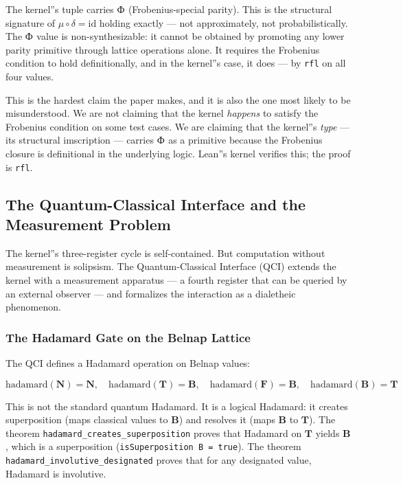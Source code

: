 \documentclass[12pt,a4paper]{article}
\begin{document}
The kernel''s tuple carries $\text{Ф}_{\text{}}$ (Frobenius-special parity). This is the structural signature of $\mu \circ \delta = \text{id}$ holding exactly --- not approximately, not probabilistically. The $\text{Ф}_{\text{}}$ value is non-synthesizable: it cannot be obtained by promoting any lower parity primitive through lattice operations alone. It requires the Frobenius condition to hold definitionally, and in the kernel''s case, it does --- by \texttt{rfl} on all four values.

This is the hardest claim the paper makes, and it is also the one most likely to be misunderstood. We are not claiming that the kernel \emph{happens} to satisfy the Frobenius condition on some test cases. We are claiming that the kernel''s \emph{type} --- its structural imscription --- carries $\text{Ф}_{\text{}}$ as a primitive because the Frobenius closure is definitional in the underlying logic. Lean''s kernel verifies this; the proof is \texttt{rfl}.

\subsection{The Quantum-Classical Interface and the Measurement Problem}

The kernel''s three-register cycle is self-contained. But computation without measurement is solipsism. The Quantum-Classical Interface (QCI) extends the kernel with a measurement apparatus --- a fourth register that can be queried by an external observer --- and formalizes the interaction as a dialetheic phenomenon.

\subsubsection{The Hadamard Gate on the Belnap Lattice}

The QCI defines a Hadamard operation on Belnap values:

\[\text{hadamard}(\mathbf{N}) = \mathbf{N}, \quad \text{hadamard}(\mathbf{T}) = \mathbf{B}, \quad \text{hadamard}(\mathbf{F}) = \mathbf{B}, \quad \text{hadamard}(\mathbf{B}) = \mathbf{T}\]

This is not the standard quantum Hadamard. It is a logical Hadamard: it creates superposition (maps classical values to $\mathbf{B}$) and resolves it (maps $\mathbf{B}$ to $\mathbf{T}$). The theorem \texttt{hadamard\_creates\_superposition} proves that Hadamard on $\mathbf{T}$ yields $\mathbf{B}$, which is a superposition (\texttt{isSuperposition B = true}). The theorem \texttt{hadamard\_involutive\_designated} proves that for any designated value, Hadamard is involutive.
\end{document}
